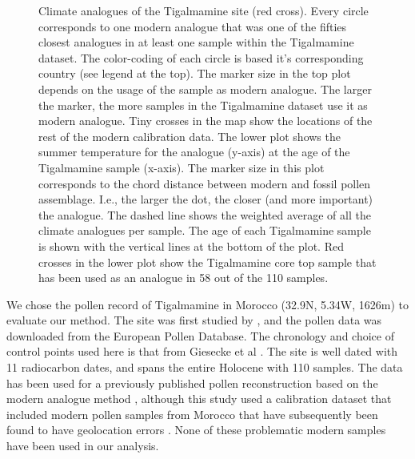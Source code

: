 \begin{refsection}
\begin{figure}
	\caption[Climate analogues of the Tigalmamine site]{Climate analogues of the Tigalmamine site (red cross). Every circle corresponds to one modern analogue that was one of the fifties closest analogues in at least one sample within the Tigalmamine dataset. The color-coding of each circle is based it's corresponding country (see legend at the top). The marker size in the top plot depends on the usage of the sample as modern analogue. The larger the marker, the more samples in the Tigalmamine dataset use it as modern analogue. Tiny crosses in the map show the locations of the rest of the modern calibration data. The lower plot shows the summer temperature for the analogue (y-axis) at the age of the Tigalmamine sample (x-axis). The marker size in this plot corresponds to the chord distance between modern and fossil pollen assemblage. I.e., the larger the dot, the closer (and more important) the analogue. The dashed line shows the weighted average of all the climate analogues per sample. The age of each Tigalmamine sample is shown with the vertical lines at the bottom of the plot. Red crosses in the lower plot show the Tigalmamine core top sample that has been used as an analogue in 58 out of the 110 samples.}
	\label{fig:gridding-site-analogues}
\end{figure}

We chose the pollen record of Tigalmamine in Morocco (32.9N, 5.34W, 1626m) to evaluate our method. The site was first studied by \cite{LambKaars1995}, and the pollen data was downloaded from the European Pollen Database. The chronology and choice of control points used here is that from Giesecke et al \citep{GieseckeDavisBrewerEtAl2013}. The site is well dated with 11 radiocarbon dates, and spans the entire Holocene with 110 samples. The data has been used for a previously published pollen reconstruction based on the modern analogue method \citep{CheddadiLambGuiotEtAl1998}, although this study used a calibration dataset that included modern pollen samples from Morocco that have subsequently been found to have geolocation errors \citep{DavisZanonCollinsEtAl2013}. None of these problematic modern samples have been used in our analysis. 


\end{refsection}

